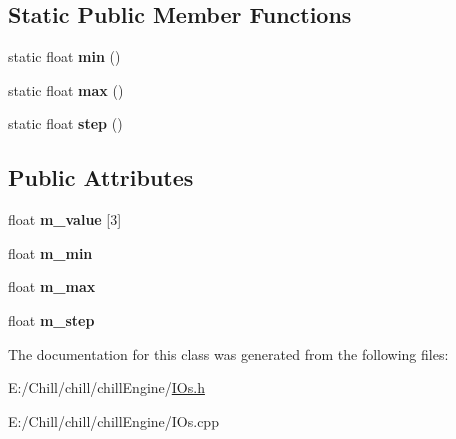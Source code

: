 \subsection*{Static Public Member Functions}
\begin{DoxyCompactItemize}
\item 
\mbox{\label{class_chill_1_1_vec3_input_a998b4d13976407b3f0df952caa1d386f}} 
static float {\bfseries min} ()
\item 
\mbox{\label{class_chill_1_1_vec3_input_a66f0d41329891c8df5b36612e1c43441}} 
static float {\bfseries max} ()
\item 
\mbox{\label{class_chill_1_1_vec3_input_a3acbedadb55f3f59324145bf72373825}} 
static float {\bfseries step} ()
\end{DoxyCompactItemize}
\subsection*{Public Attributes}
\begin{DoxyCompactItemize}
\item 
\mbox{\label{class_chill_1_1_vec3_input_a225abab9372f3b06d8704c13f4d8bc8a}} 
float {\bfseries m\+\_\+value} \mbox{[}3\mbox{]}
\item 
\mbox{\label{class_chill_1_1_vec3_input_a368659db4d1a119212a199e3bf373ce4}} 
float {\bfseries m\+\_\+min}
\item 
\mbox{\label{class_chill_1_1_vec3_input_a8a587ebaba45b941bc6cc58143600b32}} 
float {\bfseries m\+\_\+max}
\item 
\mbox{\label{class_chill_1_1_vec3_input_a37e78914224a0d3e9f3a3b3cac8e1730}} 
float {\bfseries m\+\_\+step}
\end{DoxyCompactItemize}


The documentation for this class was generated from the following files\+:\begin{DoxyCompactItemize}
\item 
E\+:/\+Chill/chill/chill\+Engine/\mbox{\hyperlink{_i_os_8h}{I\+Os.\+h}}\item 
E\+:/\+Chill/chill/chill\+Engine/I\+Os.\+cpp\end{DoxyCompactItemize}
